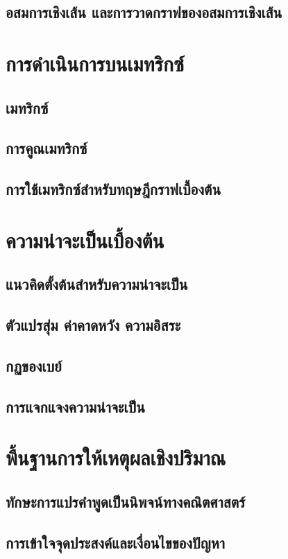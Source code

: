 \subsection{อสมการเชิงเส้น และการวาดกราฟของอสมการเชิงเส้น}


\section{การดำเนินการบนเมทริกซ์}
\subsection{เมทริกซ์}
\subsection{การคูณเมทริกซ์}
\subsection{การใช้เมทริกซ์สำหรับทฤษฎีกราฟเบื้องต้น}

\section{ความน่าจะเป็นเบื้องต้น}
\subsection{แนวคิดตั้งต้นสำหรับความน่าจะเป็น}
\subsection{ตัวแปรสุ่ม ค่าคาดหวัง ความอิสระ}
\subsection{กฏของเบย์}
\subsection{การแจกแจงความน่าจะเป็น}

\section{พื้นฐานการให้เหตุผลเชิงปริมาณ}\label{section:mathexpression}
\subsection{ทักษะการแปรคำพูดเป็นนิพจน์ทางคณิตศาสตร์}
\subsection{การเข้าใจจุดประสงค์และเงื่อนไขของปัญหา}